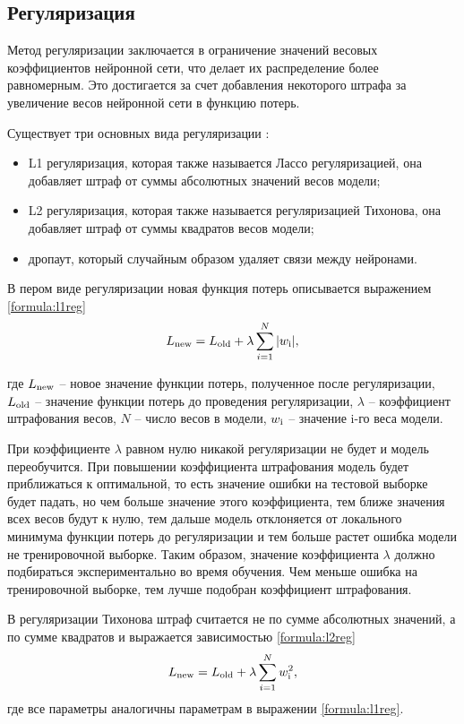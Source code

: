 \subsection{Регуляризация}
Метод регуляризации заключается в ограничение значений весовых коэффициентов нейронной сети, что делает их распределение более равномерным. Это достигается за счет добавления некоторого штрафа за увеличение весов нейронной сети в функцию потерь.

Существует три основных вида регуляризации \cite{regulisation}:
\begin{itemize}
	\item L1 регуляризация, которая также называется Лассо регуляризацией, она добавляет штраф от суммы абсолютных значений весов модели;
	\item L2 регуляризация, которая также называется регуляризацией Тихонова, она добавляет штраф от суммы квадратов весов модели;
	\item дропаут, который случайным образом удаляет связи между нейронами.
\end{itemize}

В пером виде регуляризации новая функция потерь описывается выражением \ref{formula:l1reg}
\begin{equation}\label{formula:l1reg}
L_{\rm{new}} = L_{\rm{old}} + \lambda\sum\limits_{i=1}^{N}|w_{\rm{i}}|,
\end{equation}

где $L_{\rm{new}}$ -- новое значение функции потерь, полученное после регуляризации, $L_{\rm{old}}$ -- значение функции потерь до проведения регуляризации, $\lambda$ -- коэффициент штрафования весов, $N$ -- число весов в модели, $w_{\rm{i}}$ -- значение i-го веса модели.

При коэффициенте $\lambda$ равном нулю никакой регуляризации не будет и модель переобучится. При повышении коэффициента штрафования модель будет приближаться к оптимальной, то есть значение ошибки на тестовой выборке будет падать, но чем больше значение этого коэффициента, тем ближе значения всех весов будут к нулю, тем дальше модель отклоняется от локального минимума функции потерь до регуляризации и тем больше растет ошибка модели не тренировочной выборке. Таким образом, значение коэффициента $\lambda$ должно подбираться экспериментально во время обучения. Чем меньше ошибка на тренировочной выборке, тем лучше подобран коэффициент штрафования.

В регуляризации Тихонова штраф считается не по сумме абсолютных значений, а по сумме квадратов и выражается зависимостью \ref{formula:l2reg}
\begin{equation}\label{formula:l2reg}
L_{\rm{new}} = L_{\rm{old}} + \lambda\sum\limits_{i=1}^{N}w_{\rm{i}}^2,
\end{equation}
где все параметры аналогичны параметрам в выражении \ref{formula:l1reg}.

